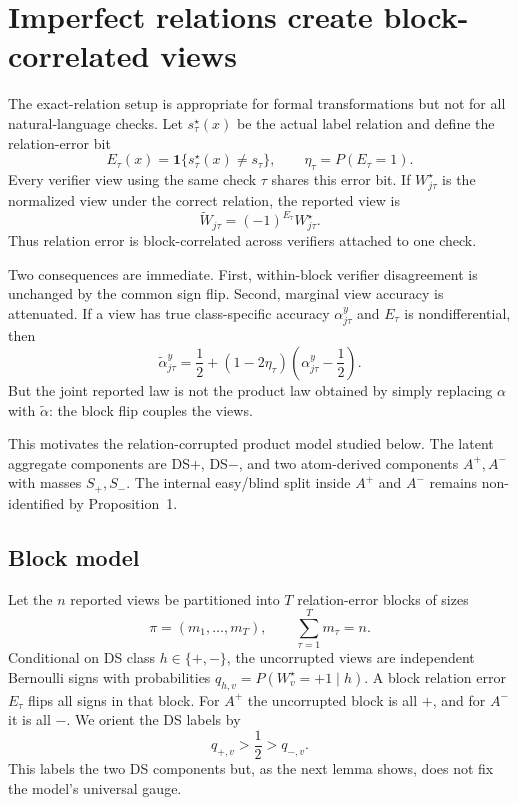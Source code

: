 \documentclass[11pt]{article}
\theoremstyle{definition}
\theoremstyle{remark}
\begin{document}
\section{Imperfect relations create block-correlated views}
\label{sec:corrupt}

The exact-relation setup is appropriate for formal transformations but not for all natural-language checks. Let $s_\tau^\star(x)$ be the actual label relation and define the relation-error bit
\[
E_\tau(x)=\mathbf{1}\{s_\tau^\star(x)\neq s_\tau\},
\qquad
\eta_\tau=P(E_\tau=1).
\]
Every verifier view using the same check $\tau$ shares this error bit. If $W_{j\tau}^\star$ is the normalized view under the correct relation, the reported view is
\[
\widetilde W_{j\tau}=(-1)^{E_\tau}W_{j\tau}^\star.
\]
Thus relation error is block-correlated across verifiers attached to one check.

Two consequences are immediate. First, within-block verifier disagreement is unchanged by the common sign flip. Second, marginal view accuracy is attenuated. If a view has true class-specific accuracy $\alpha_{j\tau}^y$ and $E_\tau$ is nondifferential, then
\[
\widetilde\alpha_{j\tau}^y
=\frac12+(1-2\eta_\tau)\left(\alpha_{j\tau}^y-\frac12\right).
\]
But the joint reported law is not the product law obtained by simply replacing $\alpha$ with $\widetilde\alpha$: the block flip couples the views.

This motivates the relation-corrupted product model studied below. The latent aggregate components are DS$+$, DS$-$, and two atom-derived components $A^+,A^-$ with masses $S_+,S_-$. The internal easy/blind split inside $A^+$ and $A^-$ remains non-identified by Proposition~1.

\subsection{Block model}

Let the $n$ reported views be partitioned into $T$ relation-error blocks of sizes
\[
\pi=(m_1,\ldots,m_T),\qquad \sum_{\tau=1}^Tm_\tau=n.
\]
Conditional on DS class $h\in\{+,-\}$, the uncorrupted views are independent Bernoulli signs with probabilities $q_{h,v}=P(W_v^\star=+1\mid h)$. A block relation error $E_\tau$ flips all signs in that block. For $A^+$ the uncorrupted block is all $+$, and for $A^-$ it is all $-$. We orient the DS labels by
\[
q_{+,v}>\frac12>q_{-,v}.
\]
This labels the two DS components but, as the next lemma shows, does not fix the model's universal gauge.
\end{document}
